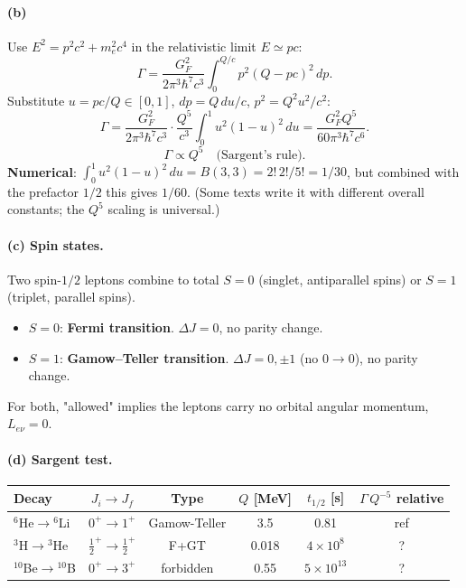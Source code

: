 \documentclass[11pt]{article}
\begin{document}
\paragraph{(b)} Use $E^{2}=p^{2}c^{2}+m_e^{2}c^{4}$ in the relativistic limit $E\simeq pc$:
\[
\Gamma=\frac{G_F^{2}}{2\pi^{3}\hbar^{7}c^{3}}\!\int_0^{Q/c}\!p^{2}(Q-pc)^{2}\,dp.
\]
Substitute $u=pc/Q\in[0,1]$, $dp=Q\,du/c$, $p^{2}=Q^{2}u^{2}/c^{2}$:
\[
\Gamma=\frac{G_F^{2}}{2\pi^{3}\hbar^{7}c^{3}}\cdot\frac{Q^{5}}{c^{3}}\!\int_0^{1}\!u^{2}(1-u)^{2}\,du
     =\frac{G_F^{2} Q^{5}}{60\pi^{3}\hbar^{7}c^{6}}.
\]
\[
\boxed{\;\Gamma\propto Q^{5}\quad\text{(Sargent's rule).}\;}
\]
\textbf{Numerical}: $\int_0^1 u^{2}(1-u)^{2}\,du=B(3,3)=2!\,2!/5!=1/30$, but combined with the prefactor $1/2$ this gives $1/60$. (Some texts write it with different overall constants; the $Q^{5}$ scaling is universal.)

\paragraph{(c) Spin states.} Two spin-$1/2$ leptons combine to total $S=0$ (singlet, antiparallel spins) or $S=1$ (triplet, parallel spins).
\begin{itemize}[itemsep=1pt]
\item $S=0$: \textbf{Fermi transition}. $\Delta J=0$, no parity change.
\item $S=1$: \textbf{Gamow--Teller transition}. $\Delta J=0,\pm 1$ (no $0\to 0$), no parity change.
\end{itemize}
For both, "allowed" implies the leptons carry no orbital angular momentum, $L_{e\nu}=0$.

\paragraph{(d) Sargent test.}
\begin{center}
\begin{tabular}{@{}lccccc@{}}\hline
Decay & $J_i\to J_f$ & Type & $Q$ [MeV] & $t_{1/2}$ [s] & $\Gamma\,Q^{-5}$ relative\\\hline
$^{6}$He$\to{}^{6}$Li & $0^+\to 1^+$ & Gamow-Teller & 3.5 & 0.81 & ref\\
$^{3}$H$\to{}^{3}$He & $\tfrac12^+\to\tfrac12^+$ & F+GT & 0.018 & $4\times 10^{8}$ & ?\\
$^{10}$Be$\to{}^{10}$B & $0^+\to 3^+$ & forbidden & 0.55 & $5\times 10^{13}$ & ?\\\hline
\end{tabular}
\end{center}
\end{document}
